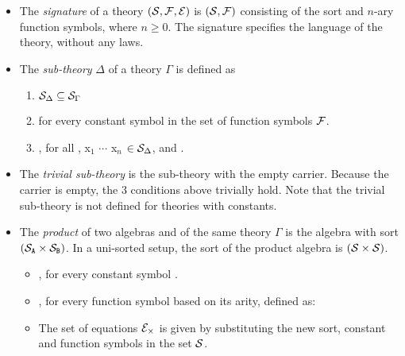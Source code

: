 \begin{itemize}
    \item The \emph{signature} of a theory $(\mathcal{S}, \mathcal{F}, \mathcal{E})$ is $(\mathcal{S}, \mathcal{F})$ consisting of the sort and $n$-ary function symbols, where $n \geq 0$. The signature specifies the language of the theory, without any laws. 
    \item The \emph{sub-theory} $\Delta$ of a theory $\Gamma$ is defined as 
    \begin{enumerate}
    \item $\mathcal{S}_\Delta \subseteq \mathcal{S}_\Gamma$ 
    \item {} \lstmath{=}  for every constant symbol in the set of function symbols $\mathcal{F}$. 
    \item {} \lstmath{=} , for all , {x$_1$ $\cdots$ x$_n$ $\in \mathcal{S}_\Delta$}, and . 
    \end{enumerate}
    \item The \emph{trivial sub-theory} is the sub-theory with the empty carrier. Because the carrier is empty, the $3$ conditions above trivially hold. Note that the trivial sub-theory is not defined for theories with constants.    
    \item The \emph{product} of two algebras  and  of the same theory $\Gamma$ is the algebra with sort $(\mathcal{S}_\texttt{A} \times \mathcal{S}_\texttt{B})$. In a uni-sorted setup, the sort of the product algebra is $(\mathcal{S} \times \mathcal{S})$. 
    \begin{itemize}
    \item {}, for every constant symbol 
      . 
    \item {}, for every function symbol  based on its arity, defined as: \newline 
    \item The set of equations $\mathcal{E}_\times$ is given by substituting the new sort, constant and function symbols in the set $\mathcal{S}$.  

\end{itemize}
\end{itemize}
